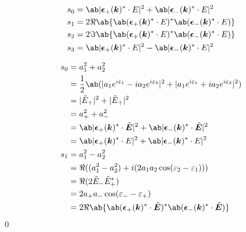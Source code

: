 \documentclass[uplatex,dvipdfmx,a4paper,11pt]{jlreq}
\makeatletter
\newcommand{\kk}{\bm{k}}
\newcommand{\ET}{\tilde{\bm{E}}}
\newcommand{\EC}{\mathcal\bm{E}}
\newcommand{\ee}{\bm{\epsilon}}
\theoremstyle{definition}
\renewenvironment{proof}[1][\proofname]{\par
  \normalfont
  \topsep6\p@\@plus6\p@ \trivlist
  \item[\hskip\labelsep{\bfseries #1}\@addpunct{\bfseries}]\ignorespaces\quad\par
}{%
  \qed\endtrivlist\@endpefalse
}
\renewcommand\proofname{証明}
\makeatother
\begin{document}
\begin{proposition}
  \begin{align}
    s_0 & = \ab|\ee_+(\kk)^*\cdot\EC|^2 + \ab|\ee_-(\kk)^*\cdot\EC|^2       \\
    s_1 & = 2\Re\ab\{\ab(\ee_+(\kk)^*\cdot\EC)^*\ab(\ee_-(\kk)^*\cdot\EC)\} \\
    s_2 & = 2\Im\ab\{\ab(\ee_+(\kk)^*\cdot\EC)^*\ab(\ee_-(\kk)^*\cdot\EC)\} \\
    s_3 & = \ab|\ee_+(\kk)^*\cdot\EC|^2 - \ab|\ee_-(\kk)^*\cdot\EC|^2
  \end{align}
\end{proposition}
\begin{proof}
  \begin{align}
    s_0 & = a_1^2 + a_2^2                                                                                                             \\
        & = \frac{1}{2}\ab(|a_1e^{i\varepsilon_1} - i a_2e^{i\varepsilon_2}|^2 + |a_1e^{i\varepsilon_1} + i a_2e^{i\varepsilon_2}|^2) \\
        & = |\tilde{E}_+|^2 + |\tilde{E}_+|^2                                                                                         \\
        & = a_+^2 + a_-^2                                                                                                             \\
        & = \ab|\ee_+(\kk)^*\cdot\ET|^2 + \ab|\ee_-(\kk)^*\cdot\ET|^2                                                                 \\
        & = \ab|\ee_+(\kk)^*\cdot\EC|^2 + \ab|\ee_-(\kk)^*\cdot\EC|^2                                                                 \\
    s_1 & = a_1^2 - a_2^2                                                                                                             \\
        & = \Re((a_1^2 - a_2^2) + i(2a_1a_2\cos(\varepsilon_2 - \varepsilon_1)))                                                      \\
        & = \Re(2\tilde{E}_-\tilde{E}_+^*)                                                                                            \\
        & = 2a_+a_-\cos(\varepsilon_- - \varepsilon_+)                                                                                \\
        & = 2\Re\ab\{\ab(\ee_+(\kk)^*\cdot\ET)^*\ab(\ee_-(\kk)^*\cdot\ET)\}                                                           \\

\end{align}
\end{proof}
\end{document}
